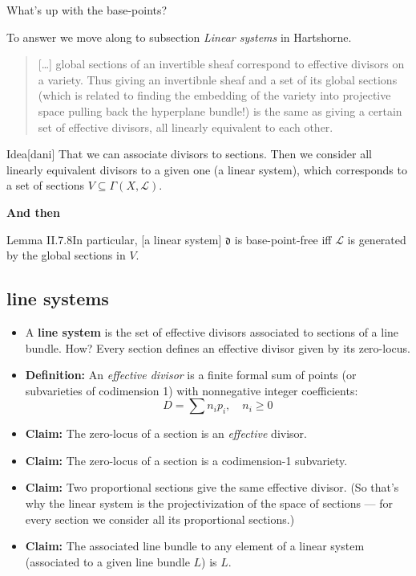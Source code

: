 \begin{question}\leavevmode
What's up with the base-points?
\end{question}

To answer we move along to subsection  \textit{Linear systems} in Hartshorne.
\begin{quotation}
	[…] global sections of an invertible sheaf correspond to effective divisors on a variety. Thus giving an invertibnle sheaf and a set of its global sections {\color{6}(which is related to finding the embedding of the variety into projective space pulling back the hyperplane bundle!)} is the same as giving a certain set of effective divisors, all linearly equivalent to each other.
\end{quotation}

\begin{thing6}{Idea}[dani]\leavevmode
That we can associate divisors to sections. Then we consider all linearly equivalent divisors to a given one (a linear system), which corresponds to a set of sections \(V \subseteq \Gamma(X,\mathcal{L})\).
\end{thing6}

\textbf{And then} 
\begin{thing4}{Lemma II.7.8}\label{lem:II.7.8}\leavevmode
	[…] In particular, [a linear system] \(\mathfrak{d}\) is base-point-free iff \(\mathcal{L}\) is generated by the global sections in \(V\).
\end{thing4}
\subsection{line systems}
\begin{itemize}
  \item A \textbf{line system} is the set of effective divisors associated to sections of a line bundle. How? Every section defines an effective divisor given by its zero-locus.
  
  \item \textbf{Definition:} An \emph{effective divisor} is a finite formal sum of points (or subvarieties of codimension 1) with nonnegative integer coefficients:
  \[
  D = \sum n_i p_i, \quad n_i \geq 0
  \]
  
  \item \textbf{Claim:} The zero-locus of a section is an \emph{effective} divisor.
\item \textbf{Claim:} The zero-locus of a section is a codimension-1 subvariety. 

  \item \textbf{Claim:} Two proportional sections give the same effective divisor. (So that's why the linear system is the projectivization of the space of sections — for every section we consider all its proportional sections.)
\item \textbf{Claim:} The associated line bundle to any element of a linear system (associated to a given line bundle \(L\)) is \(L\). 
\end{itemize}

